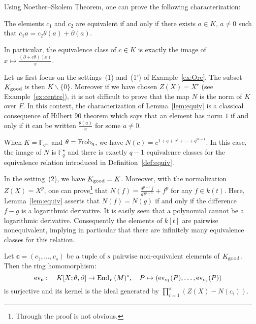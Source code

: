 \documentclass[a4paper]{llncs}
\newcommand{\FF}{\mathbb F}
\newcommand{\End}{\textrm{\rm End}}
\newcommand{\Frob}{\textrm{\rm Frob}}
\newcommand{\ev}[1]{\textrm{\rm ev}_{#1}}
\newcommand{\bc}{\textbf{c}}
\newcommand{\good}{\textrm{\rm good}}
\begin{document}
\noindent
Using Noether--Skolem Theorem, one can prove the following
characterization:

\begin{lemma}
\label{lem:equiv}
The elements $c_1$ and $c_2$ are equivalent if and only if there exists 
$a \in K$, $a \neq 0$ such that $c_1 a = c_2 \theta(a) + \partial(a)$.

\noindent
In particular, the equivalence class of $c \in K$ is exactly the image 
of $x \mapsto \frac{(\partial + c\theta)(x)} x$.
\end{lemma}

{\small
\begin{example}
\label{ex:equiv}
Let us first focus on the settings~(1) and~(1') of Example~\ref{ex:Ore}. 
The subset $K_\good$ is then $K \backslash \{0\}$. Moreover if we have 
chosen $Z(X) = X^r$ (see Example~\ref{ex:centre}), it is not difficult
to prove that the map $N$ is the norm of $K$ over $F$.
In this context, the characterization of Lemma~\ref{lem:equiv} is 
a classical consequence of Hilbert 90 theorem which says that an
element has norm $1$ if and only if it can be written 
$\frac{\theta(a)} a$ for some $a \neq 0$.

\noindent
When $K = \FF_{q^m}$ and $\theta = \Frob_q$, we have 
$N(c) = c^{1 + q + q^2 + \cdots + q^{m-1}}$. In this case, the image of 
$N$ is $\FF_q^\star$ and there is exactly $q{-}1$ equivalence classes 
for the equivalence relation introduced in Definition~\ref{def:equiv}.

In the setting~(2), we have $K_\good = K$. Moreover, with the 
normalization $Z(X) = X^p$, one can prove\footnote{Through the proof is 
not obvious.} that $N(f) = \frac {d^{p-1}f}{dt^{p-1}} + f^p$ for any $f 
\in k(t)$. Here, Lemma~\ref{lem:equiv} asserts that $N(f) = N(g)$ if
and only if the difference $f-g$ is a logarithmic derivative.
It is easily seen that a polynomial cannot be a logarithmic derivative.
Consequently the elements of $k[t]$ are pairwise nonequivalent,
implying in particular that there are infinitely many equivalence
classes for this relation.
\end{example}}

\begin{proposition}
\label{prop:evbc}
Let $\bc = (c_1, \ldots, c_s)$ be a tuple of $s$ pairwise non-equivalent 
elements of $K_\good$.
Then the ring homomorphism:
$$\ev \bc : \quad K[X;\theta,\partial] \to \End_F(M)^s, \quad
P \mapsto (\ev{c_1}(P), \ldots, \ev{c_s}(P))$$
is surjective and its kernel is the ideal generated by
$\prod_{i=1}^s (Z(X) - N(c_i))$.
\end{proposition}
\end{document}
